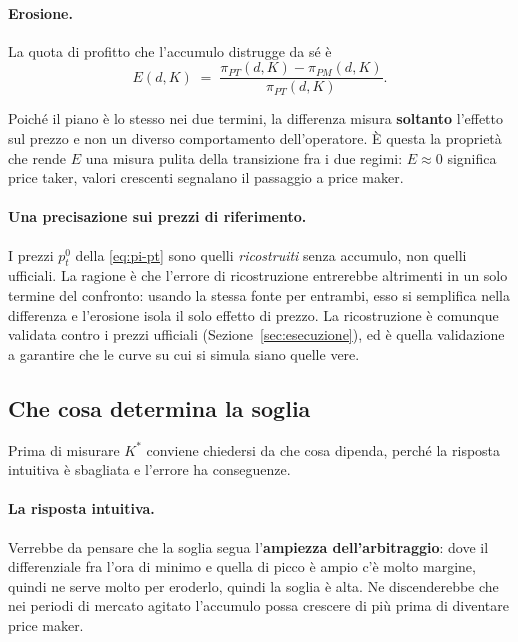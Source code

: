 \paragraph{Erosione.} La quota di profitto che l'accumulo distrugge da s\'e \`e
\begin{equation}
E(d,K) \;=\; \frac{\pi_{PT}(d,K) - \pi_{PM}(d,K)}{\pi_{PT}(d,K)}.
\label{eq:erosione}
\end{equation}

Poich\'e il piano \`e lo stesso nei due termini, la differenza misura \textbf{soltanto}
l'effetto sul prezzo e non un diverso comportamento dell'operatore. \`E questa la propriet\`a
che rende $E$ una misura pulita della transizione fra i due regimi: $E \approx 0$ significa
price taker, valori crescenti segnalano il passaggio a price maker.

\paragraph{Una precisazione sui prezzi di riferimento.} I prezzi $p^{0}_t$ della
\eqref{eq:pi-pt} sono quelli \emph{ricostruiti} senza accumulo, non quelli ufficiali. La
ragione \`e che l'errore di ricostruzione entrerebbe altrimenti in un solo termine del
confronto: usando la stessa fonte per entrambi, esso si semplifica nella differenza e
l'erosione isola il solo effetto di prezzo. La ricostruzione \`e comunque validata contro i
prezzi ufficiali (Sezione~\ref{sec:esecuzione}), ed \`e quella validazione a garantire che le
curve su cui si simula siano quelle vere.

\subsection{Che cosa determina la soglia}
\label{sec:cosa-determina}

Prima di misurare $K^*$ conviene chiedersi da che cosa dipenda, perch\'e la risposta
intuitiva \`e sbagliata e l'errore ha conseguenze.

\paragraph{La risposta intuitiva.} Verrebbe da pensare che la soglia segua l'\textbf{ampiezza
dell'arbitraggio}: dove il differenziale fra l'ora di minimo e quella di picco \`e ampio c'\`e
molto margine, quindi ne serve molto per eroderlo, quindi la soglia \`e alta. Ne discenderebbe
che nei periodi di mercato agitato l'accumulo possa crescere di pi\`u prima di diventare price
maker.


